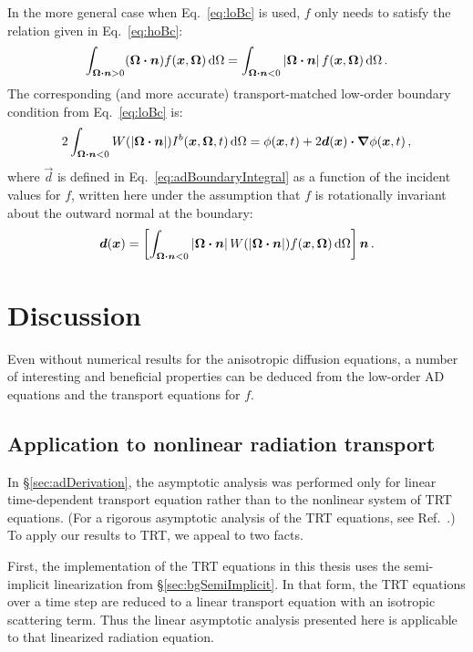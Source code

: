 In the more general case when Eq.~\eqref{eq:loBc} is used, $f$ only needs to
satisfy the relation given in Eq.~\eqref{eq:hoBc}:
\begin{equation*}
  \int_{\bm{\Omega}\bm{\cdot}\bm{n} > 0} (\bm{\Omega}\bm{\cdot} \bm{n})
  f(\bm{x}, \bm{\Omega}) \mathop{}\!\mathrm{d}\Omega
  =
  \int_{\bm{\Omega}\bm{\cdot}\bm{n} < 0} \left| \bm{\Omega}\bm{\cdot} \bm{n} \right|
  f(\bm{x}, \bm{\Omega}) \mathop{}\!\mathrm{d}\Omega \,.
\end{equation*}
The corresponding (and more accurate) transport-matched low-order boundary
condition from Eq.~\eqref{eq:loBc} is:
\begin{equation*}
2\int_{\bm{\Omega}\bm{\cdot}\bm{n} < 0} W(\left| \bm{\Omega}\bm{\cdot}\bm{n} \right|)
I^b(\bm{x},\bm{\Omega},t) \mathop{}\!\mathrm{d}\Omega
=
\phi(\bm{x},t)
+ 2 \bm{d}(\bm{x}) \bm{\cdot} \bm{\nabla} \phi(\bm{x},t)\,,
\end{equation*}
where $\vec{d}$ is defined in Eq.~\eqref{eq:adBoundaryIntegral} as a function
of the incident values for $f$, written here under the assumption that $f$ is
rotationally invariant about the outward normal at the boundary:
\begin{equation*}
  \bm{d}(\bm{x})
  = \left[ \int_{\bm{\Omega}\bm{\cdot}\bm{n} < 0}
  \left| \bm{\Omega}\bm{\cdot}\bm{n} \right| W(\left| \bm{\Omega}\bm{\cdot}\bm{n} \right|)
  f(\bm{x}, \bm{\Omega}) \mathop{}\!\mathrm{d}\Omega\right] \bm{n}\,.
\end{equation*}

\section{Discussion}
Even without numerical results for the anisotropic diffusion equations, a
number of interesting and beneficial properties can be deduced from the
low-order AD equations and the transport equations for $f$.

\subsection{Application to nonlinear radiation transport}
\label{sec:appNonlinear}

In \S\ref{sec:adDerivation}, the asymptotic analysis was performed only for
linear time-dependent transport equation rather than to the nonlinear system of
TRT equations. (For a rigorous asymptotic analysis of the TRT equations, see
Ref.~\cite{Lar1983a}.) To apply our results to TRT, we appeal to two facts.

First, the implementation of the TRT equations in this thesis uses the
semi-implicit linearization from \S\ref{sec:bgSemiImplicit}. In that form, the
TRT equations over a time step are reduced to a linear transport equation with
an isotropic scattering term. Thus the linear asymptotic analysis presented here
is applicable to that linearized radiation equation.

